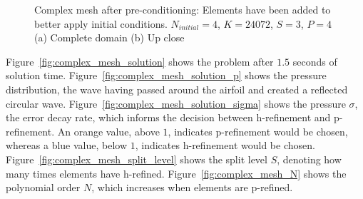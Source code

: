 \begin{figure}[H]
	\centering
	\hfill
	\caption{Complex mesh after pre-conditioning: Elements have been added to better apply initial conditions. \(N_{initial} = 4\), \(K = 24072\), \(S = 3\), \(P = 4\) (a) Complete domain (b) Up close}\label{fig:complex_mesh_pre_condition}
\end{figure}

Figure~\ref{fig:complex_mesh_solution} shows the problem after \(1.5\) seconds of solution time.
Figure~\ref{fig:complex_mesh_solution_p} shows the pressure distribution, the wave having passed
around the airfoil and created a reflected circular wave.
Figure~\ref{fig:complex_mesh_solution_sigma} shows the pressure \(\sigma \), the error decay rate,
which informs the decision between h-refinement and p-refinement. An orange value, above \(1\),
indicates p-refinement would be chosen, whereas a blue value, below \(1\), indicates h-refinement
would be chosen. Figure~\ref{fig:complex_mesh_split_level} shows the split level \(S\), denoting how
many times elements have h-refined. Figure~\ref{fig:complex_mesh_N} shows the polynomial order
\(N\), which increases when elements are p-refined.

